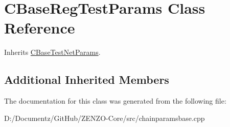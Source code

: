 \hypertarget{class_c_base_reg_test_params}{}\section{C\+Base\+Reg\+Test\+Params Class Reference}
\label{class_c_base_reg_test_params}


Inherits \mbox{\hyperlink{class_c_base_test_net_params}{C\+Base\+Test\+Net\+Params}}.

\subsection*{Additional Inherited Members}


The documentation for this class was generated from the following file\+:\begin{DoxyCompactItemize}
\item 
D\+:/\+Documentz/\+Git\+Hub/\+Z\+E\+N\+Z\+O-\/\+Core/src/chainparamsbase.\+cpp\end{DoxyCompactItemize}
